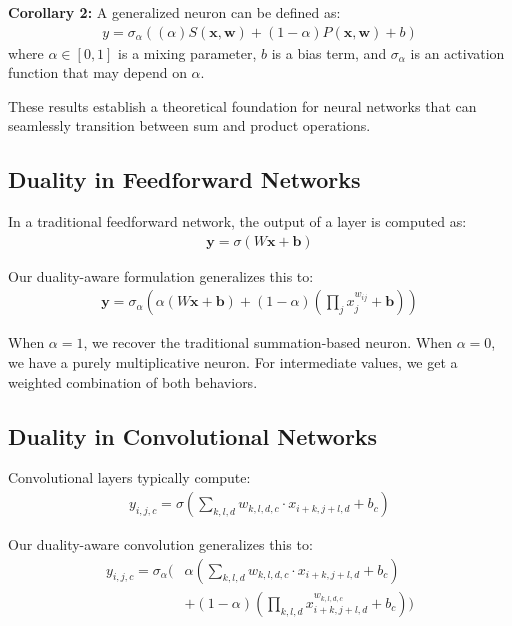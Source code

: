 \documentclass{article}
\begin{document}
\textbf{Corollary 2:} A generalized neuron can be defined as:
\begin{align}
y = \sigma_\alpha((\alpha)S(\mathbf{x}, \mathbf{w}) + (1-\alpha)P(\mathbf{x}, \mathbf{w}) + b)
\end{align}
where $\alpha \in [0, 1]$ is a mixing parameter, $b$ is a bias term, and $\sigma_\alpha$ is an activation function that may depend on $\alpha$.

These results establish a theoretical foundation for neural networks that can seamlessly transition between sum and product operations.

\subsection{Duality in Feedforward Networks}

In a traditional feedforward network, the output of a layer is computed as:
\begin{align}
\mathbf{y} = \sigma(W\mathbf{x} + \mathbf{b})
\end{align}

Our duality-aware formulation generalizes this to:
\begin{align}
\mathbf{y} = \sigma_\alpha(\alpha(W\mathbf{x} + \mathbf{b}) + (1-\alpha)(\prod_{j} x_j^{w_{ij}} + \mathbf{b}))
\end{align}

When $\alpha = 1$, we recover the traditional summation-based neuron. When $\alpha = 0$, we have a purely multiplicative neuron. For intermediate values, we get a weighted combination of both behaviors.

\subsection{Duality in Convolutional Networks}

Convolutional layers typically compute:
\begin{align}
y_{i,j,c} = \sigma(\sum_{k,l,d} w_{k,l,d,c} \cdot x_{i+k,j+l,d} + b_c)
\end{align}

Our duality-aware convolution generalizes this to:
\begin{align}
y_{i,j,c} = \sigma_\alpha(&\alpha(\sum_{k,l,d} w_{k,l,d,c} \cdot x_{i+k,j+l,d} + b_c) \nonumber \\
&+ (1-\alpha)(\prod_{k,l,d} x_{i+k,j+l,d}^{w_{k,l,d,c}} + b_c))
\end{align}
\end{document}
